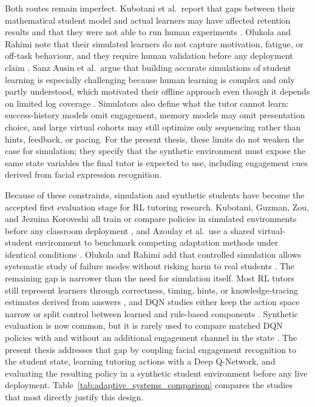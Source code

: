 Both routes remain imperfect. Kubotani et al.\ report that gaps between their mathematical student model and actual learners may have affected retention results and that they were not able to run human experiments \cite{kubotani_rltutor_2021}. Olukola and Rahimi note that their simulated learners do not capture motivation, fatigue, or off-task behaviour, and they require human validation before any deployment claim \cite{olukola_pedagogical_2026}. Sanz Ausin et al.\ argue that building accurate simulations of student learning is especially challenging because human learning is complex and only partly understood, which motivated their offline approach even though it depends on limited log coverage \cite{sanz_ausin_leveraging_2019}. Simulators also define what the tutor cannot learn: success-history models omit engagement, memory models may omit presentation choice, and large virtual cohorts may still optimize only sequencing rather than hints, feedback, or pacing. For the present thesis, these limits do not weaken the case for simulation; they specify that the synthetic environment must expose the same state variables the final tutor is expected to use, including engagement cues derived from facial expression recognition.

Because of these constraints, simulation and synthetic students have become the accepted first evaluation stage for RL tutoring research. Kubotani, Guzman, Zou, and Jezuina Koroveshi all train or compare policies in simulated environments before any classroom deployment \cite{kubotani_rltutor_2021,jezuina_koroveshi_training_2021,guzman_developing_2025,zou_deep_2026}, and Azoulay et al.\ use a shared virtual-student environment to benchmark competing adaptation methods under identical conditions \cite{azoulay_adaptive_2021}. Olukola and Rahimi add that controlled simulation allows systematic study of failure modes without risking harm to real students \cite{olukola_pedagogical_2026}. The remaining gap is narrower than the need for simulation itself. Most RL tutors still represent learners through correctness, timing, hints, or knowledge-tracing estimates derived from answers \cite{azoulay_adaptive_2021,fu_integrating_2025,guzman_developing_2025,jezuina_koroveshi_training_2021,zou_deep_2026}, and DQN studies either keep the action space narrow or split control between learned and rule-based components \cite{jezuina_koroveshi_training_2021,sayed_ai-based_2023,zou_deep_2026}. Synthetic evaluation is now common, but it is rarely used to compare matched DQN policies with and without an additional engagement channel in the state \cite{guzman_developing_2025,zou_deep_2026}. The present thesis addresses that gap by coupling facial engagement recognition to the student state, learning tutoring actions with a Deep Q-Network, and evaluating the resulting policy in a synthetic student environment before any live deployment. Table~\ref{tab:adaptive_systems_comparison} compares the studies that most directly justify this design.

